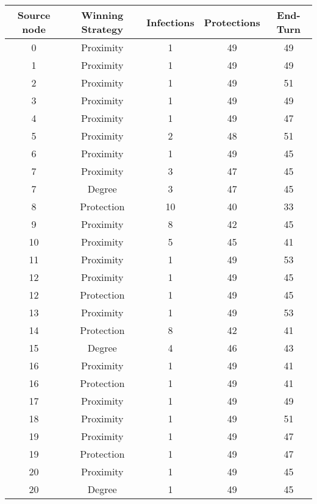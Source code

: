 \documentclass[results.tex]{subfiles}
\begin{document}
\begin{center}
  \begin{tabular}{| c || c | c | c | c |}
    \hline
    {\bfseries Source node} & {\bfseries Winning Strategy} & {\bfseries Infections} & {\bfseries Protections} & {\bfseries End-Turn} \\  %
    \hline\hline
    0 & Proximity & 1 & 49 & 49 \\ 
    \hline
    1 & Proximity & 1 & 49 & 49 \\ 
    \hline
    2 & Proximity & 1 & 49 & 51 \\ 
    \hline
    3 & Proximity & 1 & 49 & 49 \\ 
    \hline
    4 & Proximity & 1 & 49 & 47 \\ 
    \hline
    5 & Proximity & 2 & 48 & 51 \\ 
    \hline
    6 & Proximity & 1 & 49 & 45 \\ 
    \hline
    7 & Proximity & 3 & 47 & 45 \\ 
    \hline
    7 & Degree & 3 & 47 & 45 \\ 
    \hline
    8 & Protection & 10 & 40 & 33 \\ 
    \hline
    9 & Proximity & 8 & 42 & 45 \\ 
    \hline
    10 & Proximity & 5 & 45 & 41 \\ 
    \hline
    11 & Proximity & 1 & 49 & 53 \\ 
    \hline
    12 & Proximity & 1 & 49 & 45 \\ 
    \hline
    12 & Protection & 1 & 49 & 45 \\ 
    \hline
    13 & Proximity & 1 & 49 & 53 \\ 
    \hline
    14 & Protection & 8 & 42 & 41 \\ 
    \hline
    15 & Degree & 4 & 46 & 43 \\ 
    \hline
    16 & Proximity & 1 & 49 & 41 \\ 
    \hline
    16 & Protection & 1 & 49 & 41 \\ 
    \hline
    17 & Proximity & 1 & 49 & 49 \\ 
    \hline
    18 & Proximity & 1 & 49 & 51 \\ 
    \hline
    19 & Proximity & 1 & 49 & 47 \\ 
    \hline
    19 & Protection & 1 & 49 & 47 \\ 
    \hline
    20 & Proximity & 1 & 49 & 45 \\ 
    \hline
    20 & Degree & 1 & 49 & 45 \\ 

\end{tabular}
\end{center}
\end{document}
